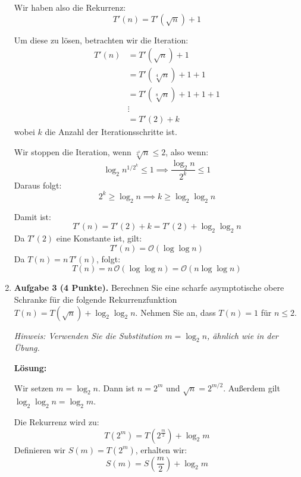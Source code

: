 \documentclass[11pt]{article}
\begin{document}
\begin{enumerate}
	      Wir haben also die Rekurrenz:
	      \[
		      T'(n) = T'(\sqrt{n}) + 1
	      \]

	      Um diese zu lösen, betrachten wir die Iteration:
	      \[
		      \begin{aligned}
			      T'(n) & = T'(\sqrt{n}) + 1            \\
			            & = T'(\sqrt[4]{n}) + 1 + 1     \\
			            & = T'(\sqrt[8]{n}) + 1 + 1 + 1 \\
			            & \vdots                        \\
			            & = T'(2) + k
		      \end{aligned}
	      \]
	      wobei \( k \) die Anzahl der Iterationsschritte ist.

	      Wir stoppen die Iteration, wenn \( \sqrt[2^{k}]{n} \leq 2 \), also wenn:
	      \[
		      \log_2 n^{1/2^{k}} \leq 1 \implies \frac{\log_2 n}{2^{k}} \leq 1
	      \]
	      Daraus folgt:
	      \[
		      2^{k} \geq \log_2 n \implies k \geq \log_2 \log_2 n
	      \]

	      Damit ist:
	      \[
		      T'(n) = T'(2) + k = T'(2) + \log_2 \log_2 n
	      \]
	      Da \( T'(2) \) eine Konstante ist, gilt:
	      \[
		      T'(n) = \mathcal{O}(\log \log n)
	      \]
	      Da \( T(n) = n\, T'(n) \), folgt:
	      \[
		      T(n) = n\, \mathcal{O}(\log \log n) = \mathcal{O}(n \log \log n)
	      \]

	\item \textbf{Aufgabe 3 (4 Punkte).} Berechnen Sie eine scharfe asymptotische obere Schranke für die folgende Rekurrenzfunktion \(T(n) = T(\sqrt{n}) + \log_{2} \log_{2} n\). Nehmen Sie an, dass \(T(n) = 1\) für \(n \leq 2\).

	      \textit{Hinweis: Verwenden Sie die Substitution \(m = \log_{2} n\), ähnlich wie in der Übung.}

	      \textbf{Lösung:}

	      Wir setzen \( m = \log_2 n \). Dann ist \( n = 2^{m} \) und \( \sqrt{n} = 2^{m/2} \). Außerdem gilt \( \log_2 \log_2 n = \log_2 m \).

	      Die Rekurrenz wird zu:
	      \[
		      T(2^{m}) = T\left( 2^{\frac{m}{2}} \right) + \log_2 m
	      \]
	      Definieren wir \( S(m) = T(2^{m}) \), erhalten wir:
	      \[
		      S(m) = S\left( \frac{m}{2} \right) + \log_2 m
	      \]


\end{enumerate}
\end{document}
